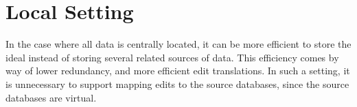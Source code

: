 \documentclass[a4paper,10pt]{article}
\begin{document}
%  

\section{Local Setting}
  In the case where all data is centrally located, it can be more efficient to store the ideal instead of storing several related sources of data. This efficiency comes by way of lower redundancy, and more efficient edit translations. In such a setting, it is unnecessary to support mapping edits to the source databases, since the source databases are virtual. 
\end{document}
